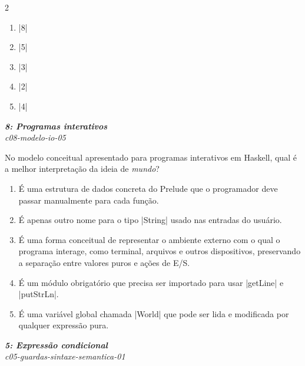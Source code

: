 \documentclass[a4paper,10pt,brazil]{article}
\begin{document}
\begin{multicols}{2}
\begin{enumerate}
  \item \haskellinline|8|

  \item \haskellinline|5|

  \item \haskellinline|3|

  \item \haskellinline|2|

  \item \haskellinline|4|


\end{enumerate}

\begin{flushright}
  \footnotesize
  \textit{\textbf{8: Programas interativos}}\\
  \textit{c08-modelo-io-05}\\

\end{flushright}
No modelo conceitual apresentado para programas interativos em Haskell, qual é a melhor interpretação da ideia de \emph{mundo}?

\begin{enumerate}
  \item É uma estrutura de dados concreta do Prelude que o programador deve passar manualmente para cada função.

  \item É apenas outro nome para o tipo \haskellinline|String| usado nas entradas do usuário.

  \item É uma forma conceitual de representar o ambiente externo com o qual o programa interage, como terminal, arquivos e outros dispositivos, preservando a separação entre valores puros e ações de E/S.

  \item É um módulo obrigatório que precisa ser importado para usar \haskellinline|getLine| e \haskellinline|putStrLn|.

  \item É uma variável global chamada \haskellinline|World| que pode ser lida e modificada por qualquer expressão pura.


\end{enumerate}

\begin{flushright}
  \footnotesize
  \textit{\textbf{5: Expressão condicional}}\\
  \textit{c05-guardas-sintaxe-semantica-01}\\


\end{flushright}
\end{multicols}
\end{document}
